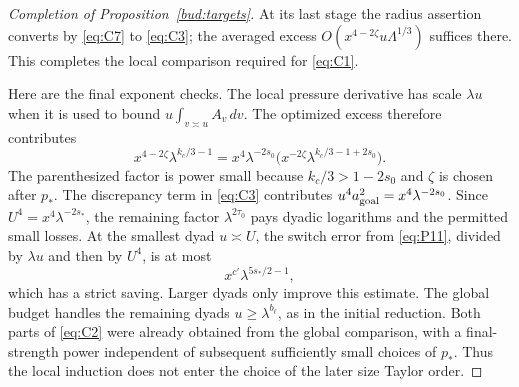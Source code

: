 \begin{proof}[Completion of Proposition~\ref{bud:targets}]
At its last stage the radius assertion converts by \eqref{eq:C7} to \eqref{eq:C3}; the averaged excess \(O(x^{4-2\zeta}u\Lambda^{1/3})\) suffices there. This completes the local comparison required for \eqref{eq:C1}.

Here are the final exponent checks.  The local pressure derivative has
scale \(\lambda u\) when it is used to bound
\(u\int_{v\asymp u}A_v\,dv\).  The optimized excess therefore contributes
\[
 x^{4-2\zeta}\lambda^{k_c/3-1}
 =x^4\lambda^{-2s_0}
       \bigl(x^{-2\zeta}\lambda^{k_c/3-1+2s_0}\bigr).
\]
The parenthesized factor is power small because
\(k_c/3>1-2s_0\) and \(\zeta\) is chosen after \(p_*\).
The discrepancy term in \eqref{eq:C3} contributes
\(u^4a_{\rm goal}^2=x^4\lambda^{-2s_0}\).
Since \(U^4=x^4\lambda^{-2s_*}\), the remaining factor
\(\lambda^{2\tau_0}\) pays dyadic logarithms and the permitted small
losses.  At the smallest dyad \(u\asymp U\), the switch error from
\eqref{eq:P11}, divided by \(\lambda u\) and then by \(U^4\), is at most
\[
 x^{c'}\lambda^{5s_*/2-1},
\]
which has a strict saving.  Larger dyads only improve this estimate.
The global budget handles the remaining dyads
\(u\ge\lambda^{b_\ell}\), as in the initial reduction.
Both parts of \eqref{eq:C2} were already obtained from the global
comparison, with a final-strength power independent of subsequent
sufficiently small choices of \(p_*\).  Thus the local induction does
not enter the choice of the later size Taylor order.
\end{proof}
